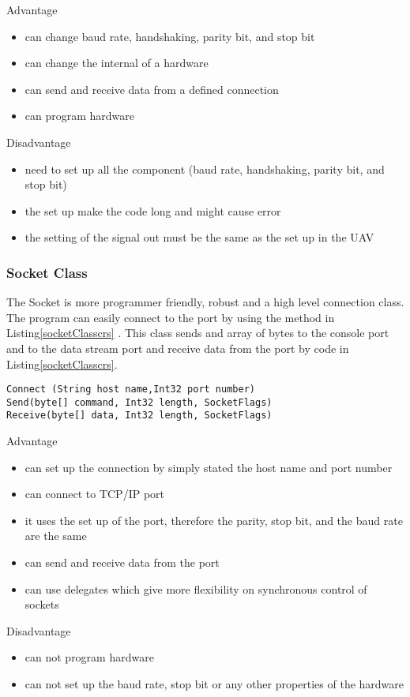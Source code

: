 Advantage 
\begin{itemize}
\item can change baud rate, handshaking, parity bit, and stop bit
\item can change the internal of a hardware
\item can send and receive data from a defined connection
\item can program hardware
\end{itemize}
Disadvantage
\begin{itemize}
\item need to set up all the component (baud rate, handshaking, parity bit, and stop bit)
\item the set up make the code long and might cause error
\item the setting of the signal out must be the same as the set up in the UAV
\end{itemize}

\subsubsection{Socket Class}
The Socket is more programmer friendly, robust and a high level connection class. 
The program can easily connect to the port by using the method in Listing\ref{socketClasscrs} .
This class sends and array of bytes to the console port and to the data stream port and receive data from the port by code in Listing\ref{socketClasscrs}.

\begin{lstlisting}[caption=Socket class connect receive and send method,label=socketClasscrs]
Connect (String host name,Int32 port number)
Send(byte[] command, Int32 length, SocketFlags)
Receive(byte[] data, Int32 length, SocketFlags)
\end{lstlisting}

Advantage
\begin{itemize}
\item can set up the connection by simply stated the host name and port number
\item can connect to TCP/IP port 
\item it uses the set up of the port, therefore the parity, stop bit, and the baud rate are the same
\item can send and receive data from the port
\item can use delegates which give more flexibility on synchronous control of sockets \cite{robertH}
\end{itemize}
Disadvantage
\begin{itemize}
\item can not program hardware
\item can not set up the baud rate, stop bit or any other properties of the hardware
\end{itemize}

